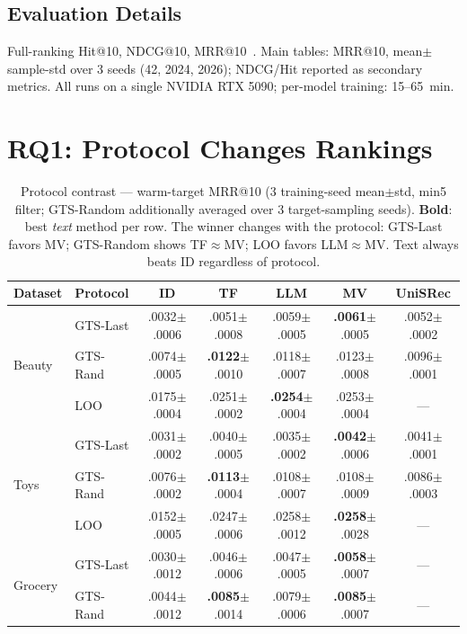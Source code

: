 \documentclass[sigconf,natbib=true,anonymous]{acmart}
\begin{document}
\subsection{Evaluation Details}

Full-ranking Hit@10, NDCG@10, MRR@10~\cite{krichene2020sampledmetrics}.
Main tables: MRR@10, mean$\pm$sample-std over 3 seeds (42, 2024, 2026); NDCG/Hit reported as secondary metrics.
All runs on a single NVIDIA RTX 5090; per-model training: 15--65~min.

\section{RQ1: Protocol Changes Rankings}
\label{sec:rq1}

\begin{table}[t]
\centering
\caption{%
Protocol contrast --- warm-target MRR@10 (3 training-seed mean$\pm$std, min5 filter; GTS-Random additionally averaged over 3 target-sampling seeds).
\textbf{Bold}: best \emph{text} method per row.
The winner changes with the protocol: GTS-Last favors MV; GTS-Random shows TF$\approx$MV; LOO favors LLM$\approx$MV.
Text always beats ID regardless of protocol.%
}
\label{tab:protocol}
\small
\setlength{\tabcolsep}{2.8pt}
\begin{tabular}{@{}llccccc@{}}
\toprule
Dataset & Protocol & ID & TF & LLM & MV & UniSRec \\
\midrule
\multirow{3}{*}{Beauty}
 & GTS-Last  & .0032\tiny{$\pm$.0006} & .0051\tiny{$\pm$.0008} & .0059\tiny{$\pm$.0005} & \textbf{.0061}\tiny{$\pm$.0005} & .0052\tiny{$\pm$.0002} \\
 & GTS-Rand  & .0074\tiny{$\pm$.0005} & \textbf{.0122}\tiny{$\pm$.0010} & .0118\tiny{$\pm$.0007} & .0123\tiny{$\pm$.0008} & .0096\tiny{$\pm$.0001} \\
 & LOO       & .0175\tiny{$\pm$.0004} & .0251\tiny{$\pm$.0002} & \textbf{.0254}\tiny{$\pm$.0004} & .0253\tiny{$\pm$.0004} & --- \\
\midrule
\multirow{3}{*}{Toys}
 & GTS-Last  & .0031\tiny{$\pm$.0002} & .0040\tiny{$\pm$.0005} & .0035\tiny{$\pm$.0002} & \textbf{.0042}\tiny{$\pm$.0006} & .0041\tiny{$\pm$.0001} \\
 & GTS-Rand  & .0076\tiny{$\pm$.0002} & \textbf{.0113}\tiny{$\pm$.0004} & .0108\tiny{$\pm$.0007} & .0108\tiny{$\pm$.0009} & .0086\tiny{$\pm$.0003} \\
 & LOO       & .0152\tiny{$\pm$.0005} & .0247\tiny{$\pm$.0006} & .0258\tiny{$\pm$.0012} & \textbf{.0258}\tiny{$\pm$.0028} & --- \\
\midrule
\multirow{2}{*}{Grocery}
 & GTS-Last  & .0030\tiny{$\pm$.0012} & .0046\tiny{$\pm$.0006} & .0047\tiny{$\pm$.0005} & \textbf{.0058}\tiny{$\pm$.0007} & --- \\
 & GTS-Rand  & .0044\tiny{$\pm$.0012} & \textbf{.0085}\tiny{$\pm$.0014} & .0079\tiny{$\pm$.0006} & \textbf{.0085}\tiny{$\pm$.0007} & --- \\
\bottomrule
\end{tabular}
\end{table}
\end{document}
